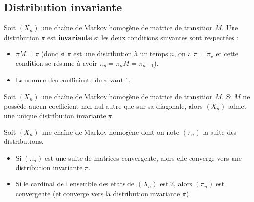 	\subsection{Distribution invariante}
	
	\begin{formula}[Définition]
		Soit $(X_n)$ une chaîne de Markov homogène de matrice de transition $M$. Une distribution $\pi$ est \textbf{invariante} si les deux conditions suivantes sont respectées :
		\begin{itemize}
			\item $\displaystyle{\pi M = \pi}$ (donc si $\pi$ est une distribution à un temps $n$, on a $\pi = \pi_n$ et cette condition se résume à avoir $\pi_n = \pi_n M = \pi_{n+1}$).
			\item La somme des coefficients de $\pi$ vaut $1$.
		\end{itemize}
	\end{formula}
	
	\begin{formula}
		Soit $(X_n)$ une chaîne de Markov homogène de matrice de transition $M$.
		\newpar
		Si $M$ ne possède aucun coefficient non nul autre que sur sa diagonale, alors $(X_n)$ admet une unique distribution invariante $\pi$.
	\end{formula}
	
	\begin{formula}
		Soit $(X_n)$ une chaîne de Markov homogène dont on note $(\pi_n)$ la suite des distributions.
		\begin{itemize}
			\item Si $(\pi_n)$ est une suite de matrices convergente, alors elle converge vers une distribution invariante $\pi$.
			\item Si le cardinal de l'ensemble des états de $(X_n)$ est $2$, alors $(\pi_n)$ est convergente (et converge vers la distribution invariante $\pi$).
		\end{itemize}
	\end{formula}
	
